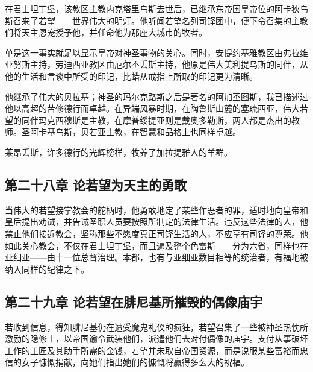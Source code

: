 在君士坦丁堡，该教区主教内克塔里乌斯去世后，已继承东帝国皇帝位的阿卡狄乌斯召来了若望——世界伟大的明灯。他听闻若望名列司铎团中，便下令召集的主教们将天主恩宠授予他，并任命他为那座大城市的牧者。\par

单是这一事实就足以显示皇帝对神圣事物的关心。同时，安提约基雅教区由弗拉维亚努斯主持，劳迪西亚教区由厄尔丕丢斯主持，他原是伟大美利提乌斯的同伴，从他的生活和言谈中所受的印记，比蜡从戒指上所取的印记更为清晰。\par

他继承了伟大的贝拉基；神圣的玛尔克路斯之后是著名的阿加丕图斯，我已描述过他以高超的苦修德行而卓越。在异端风暴时期，在陶鲁斯山麓的塞琉西亚，伟大若望的同伴玛克西穆斯是主教，在摩普绥提亚则是戴奥多勒斯，两人都是杰出的教师。圣阿卡基乌斯，贝若亚主教，在智慧和品格上也同样卓越。\par

莱昂丢斯，许多德行的光辉榜样，牧养了加拉提雅人的羊群。\par


\subsection{第二十八章 论若望为天主的勇敢}

当伟大的若望接掌教会的舵柄时，他勇敢地定了某些作恶者的罪，适时地向皇帝和皇后提出劝诫，并告诫圣职人员要按照所制定的法律生活。违反这些法律的人，他禁止他们接近教会，坚称那些不愿度真正司铎生活的人，不应享有司铎的尊荣。他如此关心教会，不仅在君士坦丁堡，而且遍及整个色雷斯——分为六省，同样也在亚细亚——由十一位总督治理。本都，也有与亚细亚数目相等的统治者，有福地被纳入同样的纪律之下。\par


\subsection{第二十九章 论若望在腓尼基所摧毁的偶像庙宇}

若收到信息，得知腓尼基仍在遭受魔鬼礼仪的疯狂，若望召集了一些被神圣热忱所激励的隐修士，以帝国谕令武装他们，派遣他们去对付偶像的庙宇。支付从事破坏工作的工匠及其助手所需的金钱，若望并未取自帝国资源，而是说服某些富裕而忠信的女子慷慨捐献，向她们指出她们的慷慨将赢得多么大的祝福。\par


